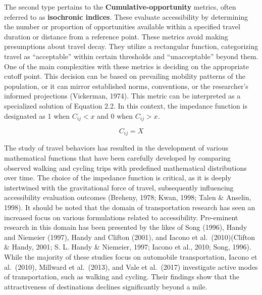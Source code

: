 \documentclass[
11pt, %
oneside, %
english, %
singlespacing, %
]{macthesis} %
\begin{document}
The second type pertains to the \textbf{Cumulative-opportunity} metrics, often referred to as \textbf{isochronic indices}. These evaluate accessibility by determining the number or proportion of opportunities available within a specified travel duration or distance from a reference point. These metrics avoid making presumptions about travel decay. They utilize a rectangular function, categorizing travel as ``acceptable'' within certain thresholds and ``unacceptable'' beyond them. One of the main complexities with these metrics is deciding on the appropriate cutoff point. This decision can be based on prevailing mobility patterns of the population, or it can mirror established norms, conventions, or the researcher's informed projections (Vickerman, 1974). This metric can be interpreted as a specialized solution of Equation 2.2. In this context, the impedance function is designated as 1 when \(C_{ij}< x\) and 0 when \(C_{ij} > x\).

\begin{equation}
C_{ij} = X
\label{eq:Rectangular form of impedance function}
\end{equation}

The study of travel behaviors has resulted in the development of various mathematical functions that have been carefully developed by comparing observed walking and cycling trips with predefined mathematical distributions over time. The choice of the impedance function is critical, as it is deeply intertwined with the gravitational force of travel, subsequently influencing accessibility evaluation outcomes (Breheny, 1978; Kwan, 1998; Talen \& Anselin, 1998). It should be noted that the domain of transportation research has seen an increased focus on various formulations related to accessibility. Pre-eminent research in this domain has been presented by the likes of Song (1996), Handy and Niemeier (1997), Handy and Clifton (2001), and Iacono et al.~(2010)(Clifton \& Handy, 2001; S. L. Handy \& Niemeier, 1997; Iacono et al., 2010; Song, 1996). While the majority of these studies focus on automobile transportation, Iacono et al.~(2010), Millward et al.~(2013), and Vale et al.~(2017) investigate active modes of transportation, such as walking and cycling. Their findings show that the attractiveness of destinations declines significantly beyond a mile.
\end{document}
